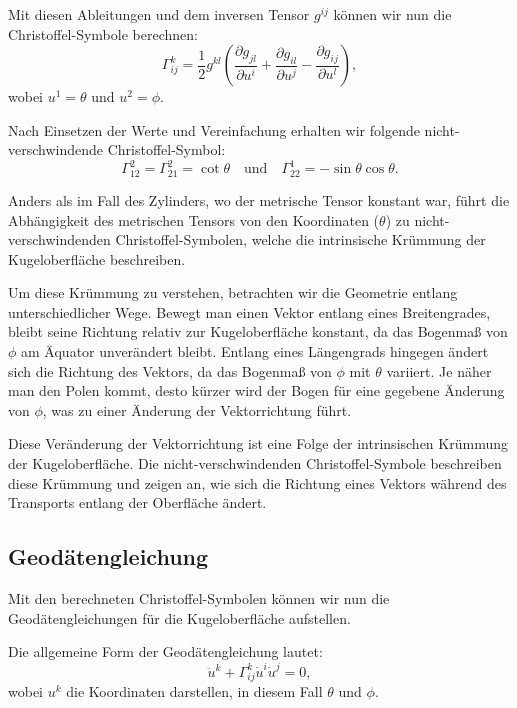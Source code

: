 Mit diesen Ableitungen und dem inversen Tensor $g^{ij}$ können wir nun die Christoffel-Symbole berechnen:
\begin{equation}
	\Gamma_{ij}^k = \frac{1}{2} g^{kl} \left( \frac{\partial g_{jl}}{\partial u^i} + \frac{\partial g_{il}}{\partial u^j} - \frac{\partial g_{ij}}{\partial u^l} \right),
\end{equation}
wobei $u^1 = \theta$ und $u^2 = \phi$.

Nach Einsetzen der Werte und Vereinfachung erhalten wir folgende nicht-verschwindende Christoffel-Symbol:
\begin{equation}
	\Gamma_{12}^2 = \Gamma_{21}^2 = \cot\theta \quad \text{und} \quad \Gamma_{22}^1 = -\sin\theta \cos\theta.
\end{equation}

Anders als im Fall des Zylinders, wo der metrische Tensor konstant war, führt die Abhängigkeit des metrischen Tensors von den Koordinaten ($\theta$) zu nicht-verschwindenden Christoffel-Symbolen, welche die intrinsische Krümmung der Kugeloberfläche beschreiben.

Um diese Krümmung zu verstehen, betrachten wir die Geometrie entlang unterschiedlicher Wege.
Bewegt man einen Vektor entlang eines Breitengrades, bleibt seine Richtung relativ zur Kugeloberfläche konstant, da das Bogenmaß von $\phi$ am Äquator unverändert bleibt.
Entlang eines Längengrads hingegen ändert sich die Richtung des Vektors, da das Bogenmaß von $\phi$ mit $\theta$ variiert.
Je näher man den Polen kommt, desto kürzer wird der Bogen für eine gegebene Änderung von $\phi$, was zu einer Änderung der Vektorrichtung führt.

Diese Veränderung der Vektorrichtung ist eine Folge der intrinsischen Krümmung der Kugeloberfläche.
Die nicht-verschwindenden Christoffel-Symbole beschreiben diese Krümmung und zeigen an, wie sich die Richtung eines Vektors während des Transports entlang der Oberfläche ändert.

\subsection{Geodätengleichung}
Mit den berechneten Christoffel-Symbolen können wir nun die Geodätengleichungen für die Kugeloberfläche aufstellen.

Die allgemeine Form der Geodätengleichung lautet:
\begin{equation}
	\ddot{u}^k + \Gamma^k_{ij} \dot{u}^i \dot{u}^j = 0,
\end{equation}
wobei $u^k$ die Koordinaten darstellen, in diesem Fall $\theta$ und $\phi$.

